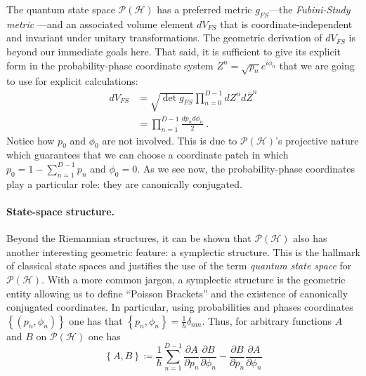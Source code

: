 \documentclass[draft,nofootinbib,pre,twocolumn,showpacs,showkeys,preprintnumbers,floatfix]{revtex4-1}
\newcommand{\1}{\mathbbm{1}}
\newcommand{\PH}{\mathcal{P}(\mathcal{H})}
\begin{document}
The quantum state space $\mathcal{P}(\mathcal{H})$ has a preferred metric 
$g_{FS}$---the \emph{Fubini-Study metric} \cite{Bengtsson2017}---and an 
associated volume element $dV_{FS}$ that is coordinate-independent and
invariant under unitary transformations. The geometric derivation of $dV_{FS}$
is beyond our immediate goals here. That said, it is sufficient to give its
explicit form in the probability-phase coordinate system $Z^n =
\sqrt{p_n}e^{i\phi_n}$ that we are going to use for explicit calculations: 
\begin{align*}
dV_{FS}
  & = \sqrt{\det g_{FS}}
  \prod_{n=0}^{D-1} dZ^n d\overline{Z}^n \\
  & =  \prod_{n=1}^{D-1} \frac{dp_n d\phi_n}{2}
  ~.
\end{align*}
Notice how $p_0$ and $\phi_0$ are not involved. This is due to
$\mathcal{P}(\mathcal{H})$'s projective nature which guarantees that we can
choose a coordinate patch in which $p_0 = 1 - \sum_{n=1}^{D-1}p_n$
and $\phi_0 = 0$. As we see now, the probability-phase coordinates play a 
particular role: they are canonically conjugated.

\paragraph*{State-space structure.} Beyond the Riemannian structures, it can 
be shown that $\PH$ also has another interesting geometric feature: a symplectic structure.
This is the hallmark of classical state spaces and justifies the use of the term 
\emph{quantum state space} for $\PH$. With a more common jargon, a symplectic
structure is the geometric entity allowing us to define ``Poisson Brackets''
and the existence of canonically conjugated coordinates. In particular, using 
probabilities and phases coordinates $\left\{ (p_n,\phi_n)\right\}$
one has that $\left\{ p_n , \phi_n \right\} = \frac{1}{\hbar}\delta_{nm}$. Thus,
for arbitrary functions $A$ and $B$ on $\PH$ one has
\begin{equation}
\left\{ A, B\right\} \coloneqq \frac{1}{\hbar}\sum_{n=1}^{D-1} \frac{\partial A}{\partial p_n} \frac{\partial B}{\partial \phi_n} - \frac{\partial B}{\partial p_n} \frac{\partial A}{\partial \phi_n}
\end{equation}
\end{document}
